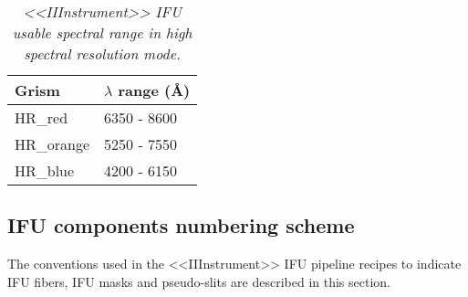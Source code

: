 \begin{table}[h]
  \begin{center}
    \begin{tabular}{|l|l|}
    \hline
      {\bf Grism} & {\bf $\lambda$ range (\AA)} \\
    \hline

HR\_red     & 6350 - 8600 \\
HR\_orange  & 5250 - 7550 \\ 
HR\_blue    & 4200 - 6150 \\

    \hline
    \end{tabular}
    \caption{\it <<IIInstrument>> IFU usable spectral range in high spectral resolution
mode.}
    \label{TIFU}
  \end{center}
\end{table}

\newpage 

\subsection{IFU components numbering scheme}
\label{IFUDEF}

The conventions used in the <<IIInstrument>> IFU pipeline
recipes to indicate IFU fibers,
IFU masks and pseudo-slits are described in this section.

